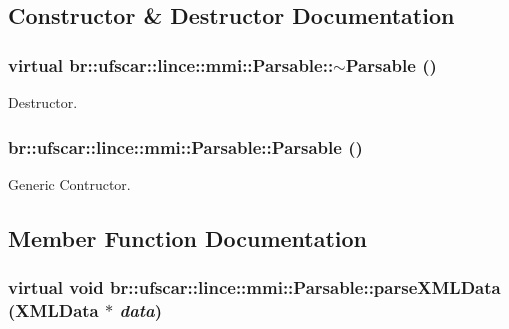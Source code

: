 \subsection{Constructor \& Destructor Documentation}
\hypertarget{classbr_1_1ufscar_1_1lince_1_1mmi_1_1Parsable_ab2537805eb3b5fd91436a72edd4a3805}{
\subsubsection[{$\sim$Parsable}]{\setlength{\rightskip}{0pt plus 5cm}virtual br::ufscar::lince::mmi::Parsable::$\sim$Parsable ()}}
\label{classbr_1_1ufscar_1_1lince_1_1mmi_1_1Parsable_ab2537805eb3b5fd91436a72edd4a3805}


Destructor. 

\hypertarget{classbr_1_1ufscar_1_1lince_1_1mmi_1_1Parsable_ade12a0d0cab87281461cca1c4bee7afd}{
\subsubsection[{Parsable}]{\setlength{\rightskip}{0pt plus 5cm}br::ufscar::lince::mmi::Parsable::Parsable ()}}
\label{classbr_1_1ufscar_1_1lince_1_1mmi_1_1Parsable_ade12a0d0cab87281461cca1c4bee7afd}


Generic Contructor. 



\subsection{Member Function Documentation}
\hypertarget{classbr_1_1ufscar_1_1lince_1_1mmi_1_1Parsable_a6524a0a77abb3865e5d255e466b6159e}{
\subsubsection[{parseXMLData}]{\setlength{\rightskip}{0pt plus 5cm}virtual void br::ufscar::lince::mmi::Parsable::parseXMLData ({\bf XMLData} $\ast$ {\em data})}}
\label{classbr_1_1ufscar_1_1lince_1_1mmi_1_1Parsable_a6524a0a77abb3865e5d255e466b6159e}


